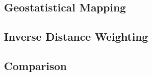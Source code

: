 \subsection{Geostatistical Mapping}\label{geostatics}


\subsection{Inverse Distance Weighting}\label{inverseweight}


\subsection{Comparison}\label{interpolationcomparison}

